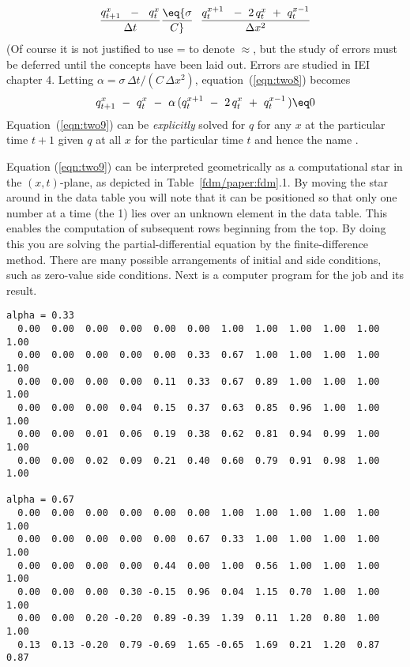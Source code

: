 \par
\begin{equation}
{ q_{{t+1}}^x \ \ -\ \ q_t^x   \over  \Delta t } \eq
{ \sigma  \over  C }
\ \ { q_t^{{x+1}}\ \ -\ 2\,q_t^x \ +\  q_t^{{x-1}}  
        \over  \Delta x^2 }
\label{eqn:two8}
\end{equation}
(Of course it is not justified to use
= to denote $ \approx $,
but the study of errors must be deferred until the concepts
have been laid out.
Errors are studied in IEI chapter 4.
Letting $\alpha = \sigma \, \Delta t / ( C\, \Delta x^2 )$,
equation~(\ref{eqn:two8}) becomes
\begin{equation}
q_{{t+1}}^x\ -\ q_t^x \ -\ \alpha \, ( q_t^{{x+1}}\ -\ 2\,q_t^x
\ +\ q_t^{{x-1}} \, ) \eq 0
\label{eqn:two9}
\end{equation}
Equation~(\ref{eqn:two9}) can be {\em  explicitly} solved for
$q$ for any $x$ at the particular time $t+1$
given $q$ at all $x$ for the particular time $t$
and hence the name {\em  {}}.
\par
Equation (\ref{eqn:two9}) can be interpreted geometrically
as a computational
star in the $(x,t)$-plane, as depicted in Table~\ref{fdm/paper:fdm}.1.
By moving the star around in the data table
you will note that it
can be positioned so that only one number at a time (the 1)
lies over an unknown element in the data table.
This enables the computation of subsequent rows
beginning from the top.
By doing this you are solving
the partial-differential equation by the
finite-difference method.
There are many possible arrangements
of initial and side conditions,
such as zero-value side conditions.
Next is a computer program for the job and its result.
\begin{verbatim}
alpha = 0.33
  0.00  0.00  0.00  0.00  0.00  0.00  1.00  1.00  1.00  1.00  1.00  1.00
  0.00  0.00  0.00  0.00  0.00  0.33  0.67  1.00  1.00  1.00  1.00  1.00
  0.00  0.00  0.00  0.00  0.11  0.33  0.67  0.89  1.00  1.00  1.00  1.00
  0.00  0.00  0.00  0.04  0.15  0.37  0.63  0.85  0.96  1.00  1.00  1.00
  0.00  0.00  0.01  0.06  0.19  0.38  0.62  0.81  0.94  0.99  1.00  1.00
  0.00  0.00  0.02  0.09  0.21  0.40  0.60  0.79  0.91  0.98  1.00  1.00

alpha = 0.67
  0.00  0.00  0.00  0.00  0.00  0.00  1.00  1.00  1.00  1.00  1.00  1.00
  0.00  0.00  0.00  0.00  0.00  0.67  0.33  1.00  1.00  1.00  1.00  1.00
  0.00  0.00  0.00  0.00  0.44  0.00  1.00  0.56  1.00  1.00  1.00  1.00
  0.00  0.00  0.00  0.30 -0.15  0.96  0.04  1.15  0.70  1.00  1.00  1.00
  0.00  0.00  0.20 -0.20  0.89 -0.39  1.39  0.11  1.20  0.80  1.00  1.00
  0.13  0.13 -0.20  0.79 -0.69  1.65 -0.65  1.69  0.21  1.20  0.87  0.87
\end{verbatim}
\begin{comment}
\par
\listing               {heat/heatex.r}
\par
\listing               {heat/heatex.2tex}
\end{comment}
